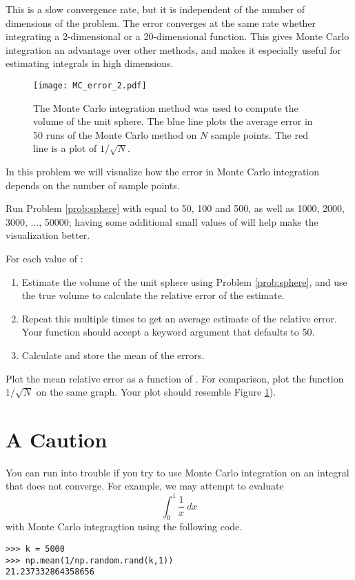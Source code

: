 This is a slow convergence rate, but it is independent of the number of dimensions of the problem. 
The error converges at the same rate whether integrating a 2-dimensional or a 20-dimensional function.
This gives Monte Carlo integration an advantage over other methods, and makes it especially useful for estimating integrals in high dimensions.


\begin{figure}
\texttt{[image: MC\_error\_2.pdf]}
\caption{The Monte Carlo integration method was used to compute the volume of the unit sphere. 
The blue line plots the average error in 50 runs of the Monte Carlo method on $N$ sample points.
The red line is a plot of $1/\sqrt{N}$. }
\label{fig:mc_error_2}
\end{figure}

\begin{problem}
In this problem we will visualize how the error in Monte Carlo integration depends on the number of sample points. 

Run Problem \ref{prob:sphere} with  equal to 50, 100 and 500, as well as 1000, 2000, 3000, ..., 50000;
having some additional small values of  will help make the visualization better.

For each value of : 
\begin{enumerate}
\item Estimate the volume of the unit sphere using Problem \ref{prob:sphere}, and use the true volume to calculate the relative error of the estimate.
\item Repeat this multiple times to get an average estimate of the relative error. Your function should accept a keyword argument  that defaults to 50.
\item Calculate and store the mean of the errors.
\end{enumerate}

Plot the mean relative error as a function of . 
For comparison, plot the function $1/\sqrt{N}$ on the same graph.
Your plot should resemble Figure \ref{fig:mc_error_2}).

\end{problem}

\section*{A Caution}
You can run into trouble if you try to use Monte Carlo integration on an integral that does not converge.
For example, we may attempt to evaluate
\[
\int_0^1 \frac{1}{x}\:dx
\]
with Monte Carlo integragtion using the following code.
\begin{lstlisting}
>>> k = 5000
>>> np.mean(1/np.random.rand(k,1))
21.237332864358656
\end{lstlisting}


